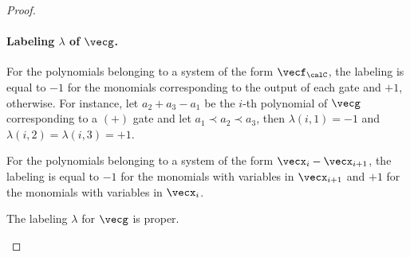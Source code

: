 \begin{proof}
        \medskip
        \paragraph{Labeling $\lambda$ of $\vecg$.} For the polynomials belonging to a
        system  of the form $\vecf_{\calC}$, the labeling is equal to
        $-1$ for the monomials corresponding to the output of each gate
        and $+1$, otherwise. For instance, let $a_2 + a_3 - a_1$ be the $i$-th
        polynomial of $\vecg$ corresponding to a $(+)$ gate and let
        $a_1 \prec a_2 \prec a_3$, then
        $\lambda(i,1) = -1$ and $\lambda(i,2) = \lambda(i,3) = +1$.

        For the polynomials belonging to a system of the form $\vecx_i - \vecx_{i+1}$,
        the labeling is equal to $-1$ for the monomials with variables in $\vecx_{i+1}$
        and $+1$ for the monomials with variables in  $\vecx_{i}$.

        \begin{claim}
          \label{cl:properLabelingForf1}
          The labeling $\lambda$ for $\vecg$ is proper.
        \end{claim}


\end{proof}
